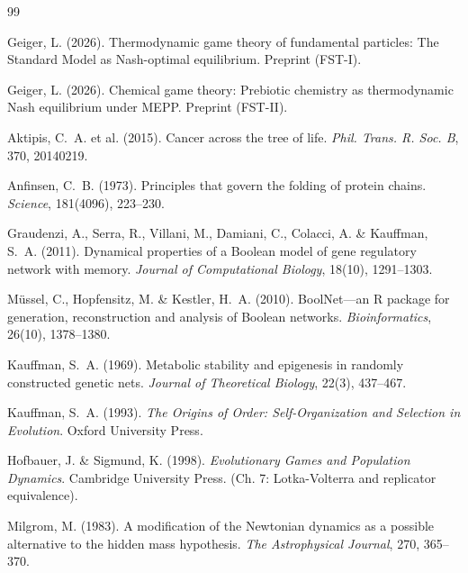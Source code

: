 \documentclass[12pt,a4paper]{article}
\theoremstyle{remark}
\begin{document}

\begin{thebibliography}{99}

Geiger, L. (2026).
\newblock Thermodynamic game theory of fundamental particles: The Standard Model as Nash-optimal equilibrium.
\newblock Preprint (FST-I).

Geiger, L. (2026).
\newblock Chemical game theory: Prebiotic chemistry as thermodynamic Nash equilibrium under MEPP.
\newblock Preprint (FST-II).

Aktipis, C.~A. et al. (2015).
\newblock Cancer across the tree of life.
\newblock \textit{Phil. Trans. R. Soc. B}, 370, 20140219.

Anfinsen, C.~B. (1973).
\newblock Principles that govern the folding of protein chains.
\newblock \textit{Science}, 181(4096), 223--230.

Graudenzi, A., Serra, R., Villani, M., Damiani, C., Colacci, A. \& Kauffman, S.~A. (2011).
\newblock Dynamical properties of a Boolean model of gene regulatory network with memory.
\newblock \textit{Journal of Computational Biology}, 18(10), 1291--1303.

M\"ussel, C., Hopfensitz, M. \& Kestler, H.~A. (2010).
\newblock BoolNet---an R package for generation, reconstruction and analysis of Boolean networks.
\newblock \textit{Bioinformatics}, 26(10), 1378--1380.

Kauffman, S.~A. (1969).
\newblock Metabolic stability and epigenesis in randomly constructed genetic nets.
\newblock \textit{Journal of Theoretical Biology}, 22(3), 437--467.

Kauffman, S.~A. (1993).
\newblock \textit{The Origins of Order: Self-Organization and Selection in Evolution}.
\newblock Oxford University Press.

Hofbauer, J. \& Sigmund, K. (1998).
\newblock \textit{Evolutionary Games and Population Dynamics}.
\newblock Cambridge University Press. (Ch. 7: Lotka-Volterra and replicator equivalence).

Milgrom, M. (1983).
\newblock A modification of the Newtonian dynamics as a possible alternative to the hidden mass hypothesis.
\newblock \textit{The Astrophysical Journal}, 270, 365--370.


\end{thebibliography}
\end{document}
